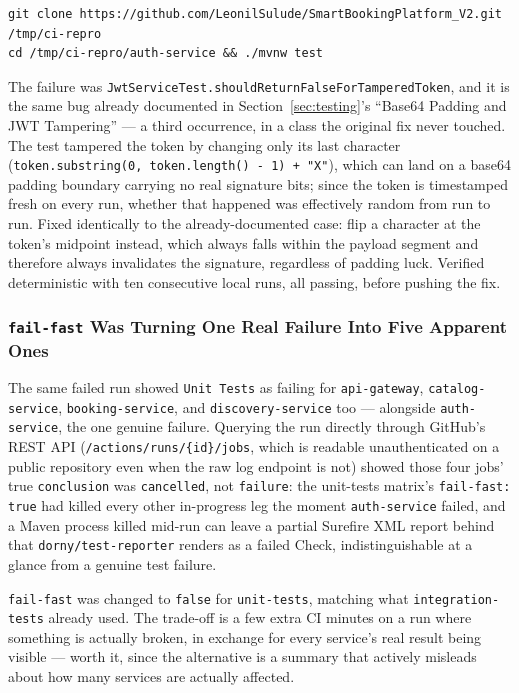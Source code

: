 \begin{lstlisting}[style=yamlstyle, caption={Reproducing a CI failure with a disposable clone, not the working copy}]
git clone https://github.com/LeonilSulude/SmartBookingPlatform_V2.git /tmp/ci-repro
cd /tmp/ci-repro/auth-service && ./mvnw test
\end{lstlisting}

The failure was \texttt{JwtServiceTest.shouldReturnFalseForTamperedToken}, and it is the same bug already documented in Section~\ref{sec:testing}'s ``Base64 Padding and JWT Tampering'' --- a third occurrence, in a class the original fix never touched. The test tampered the token by changing only its last character (\texttt{token.substring(0, token.length() - 1) + "X"}), which can land on a base64 padding boundary carrying no real signature bits; since the token is timestamped fresh on every run, whether that happened was effectively random from run to run. Fixed identically to the already-documented case: flip a character at the token's midpoint instead, which always falls within the payload segment and therefore always invalidates the signature, regardless of padding luck. Verified deterministic with ten consecutive local runs, all passing, before pushing the fix.

\subsubsection{\texttt{fail-fast} Was Turning One Real Failure Into Five Apparent Ones}

The same failed run showed \texttt{Unit Tests} as failing for \texttt{api-gateway}, \texttt{catalog-service}, \texttt{booking-service}, and \texttt{discovery-service} too --- alongside \texttt{auth-service}, the one genuine failure. Querying the run directly through GitHub's REST API (\texttt{/actions/runs/\{id\}/jobs}, which is readable unauthenticated on a public repository even when the raw log endpoint is not) showed those four jobs' true \texttt{conclusion} was \texttt{cancelled}, not \texttt{failure}: the unit-tests matrix's \texttt{fail-fast: true} had killed every other in-progress leg the moment \texttt{auth-service} failed, and a Maven process killed mid-run can leave a partial Surefire XML report behind that \texttt{dorny/test-reporter} renders as a failed Check, indistinguishable at a glance from a genuine test failure.

\texttt{fail-fast} was changed to \texttt{false} for \texttt{unit-tests}, matching what \texttt{integration-tests} already used. The trade-off is a few extra CI minutes on a run where something is actually broken, in exchange for every service's real result being visible --- worth it, since the alternative is a summary that actively misleads about how many services are actually affected.

